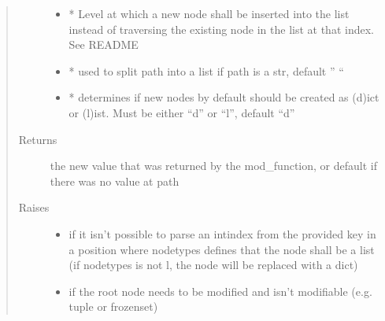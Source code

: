 \documentclass[a4paper,10pt,english]{sphinxmanual}
\begin{document}
\begin{fulllineitems}
\begin{fulllineitems}
\begin{quote}
\begin{description}
\begin{itemize}
\item {}
\sphinxAtStartPar
{} \textendash{} * Level at which a new node shall be inserted into the list instead of traversing the
existing node in the list at that index. See README

\item {}
\sphinxAtStartPar
{} \textendash{} * used to split path into a list if path is a str, default ” “

\item {}
\sphinxAtStartPar
{} \textendash{} * determines if new nodes by default should be created as (d)ict or (l)ist. Must be
either “d” or “l”, default “d”

\end{itemize}

\item[{Returns}] \leavevmode
\sphinxAtStartPar
the new value that was returned by the mod\_function, or default if there was no value at path

\item[{Raises}] \leavevmode\begin{itemize}
\item {}
\sphinxAtStartPar
{} \textendash{} if it isn’t possible to parse an int\sphinxhyphen{}index from the provided key in a position where node\sphinxhyphen{}types
    defines that the node shall be a list (if node\sphinxhyphen{}types is not l, the node will be replaced with a dict)

\item {}
\sphinxAtStartPar
{} \textendash{} if the root node needs to be modified and isn’t modifiable (e.g. tuple or frozenset)

\end{itemize}

\end{description}\end{quote}

\end{fulllineitems}



\end{fulllineitems}
\end{document}

